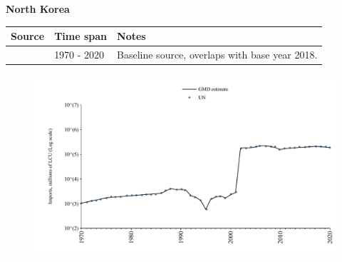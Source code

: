 \documentclass[12pt,a4paper,landscape]{article}
\begin{document}
\begin{adjustbox}{max totalsize={\paperwidth}{\paperheight},center}
\begin{minipage}[t][\textheight][t]{\textwidth}
\vspace*{0.5cm}
{}
\begin{center}
{\Large\bfseries North Korea}
\end{center}
\vspace{0.5cm}
\begin{table}[H]
\centering
\small
\begin{tabular}{|l|l|l|}
\hline
\textbf{Source} & \textbf{Time span} & \textbf{Notes} \\
\hline
\rowcolor{white}\cite{UN}& 1970 - 2020 &Baseline source, overlaps with base year 2018.\\
\hline
\end{tabular}
\end{table}
\begin{figure}[H]
\centering
\includegraphics[width=\textwidth,height=0.6\textheight,keepaspectratio]{graphs/PRK_imports.pdf}
\end{figure}
\end{minipage}
\end{adjustbox}
\end{document}
